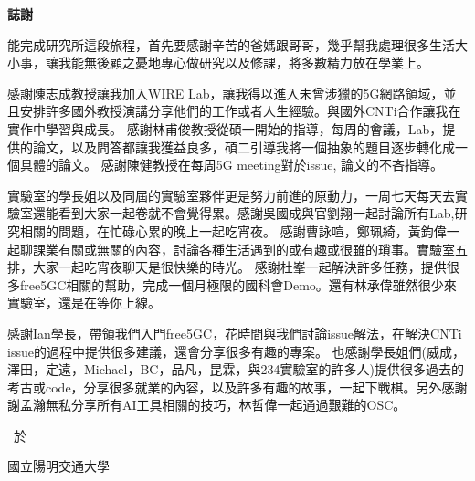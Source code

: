 \thispagestyle{empty}

\begin{center}
\Large
\textbf{誌\hspace{1cm}謝}
\end{center}

\vspace{1cm}
{
\linespread{2}%
\selectfont
\hspace{0.25cm}

能完成研究所這段旅程，首先要感謝辛苦的爸媽跟哥哥，幾乎幫我處理很多生活大小事，讓我能無後顧之憂地專心做研究以及修課，將多數精力放在學業上。

感謝陳志成教授讓我加入WIRE Lab，讓我得以進入未曾涉獵的5G網路領域，並且安排許多國外教授演講分享他們的工作或者人生經驗。與國外CNTi合作讓我在實作中學習與成長。
感謝林甫俊教授從碩一開始的指導，每周的會議，Lab，提供的論文，以及問答都讓我獲益良多，碩二引導我將一個抽象的題目逐步轉化成一個具體的論文。
感謝陳健教授在每周5G meeting對於issue, 論文的不吝指導。

實驗室的學長姐以及同屆的實驗室夥伴更是努力前進的原動力，一周七天每天去實驗室還能看到大家一起卷就不會覺得累。感謝吳國成與官劉翔一起討論所有Lab,研究相關的問題，在忙碌心累的晚上一起吃宵夜。
感謝曹詠喧，鄭珮綺，黃鈞偉一起聊課業有關或無關的內容，討論各種生活遇到的或有趣或很雖的瑣事。實驗室五排，大家一起吃宵夜聊天是很快樂的時光。
感謝杜峯一起解決許多任務，提供很多free5GC相關的幫助，完成一個月極限的國科會Demo。還有林承偉雖然很少來實驗室，還是在等你上線。

感謝Ian學長，帶領我們入門free5GC，花時間與我們討論issue解法，在解決CNTi issue的過程中提供很多建議，還會分享很多有趣的專案。
也感謝學長姐們(威成，澤田，定遠，Michael，BC，品凡，昆霖，與234實驗室的許多人)提供很多過去的考古或code，分享很多就業的內容，以及許多有趣的故事，一起下戰棋。另外感謝謝孟瀚無私分享所有AI工具相關的技巧，林哲偉一起通過艱難的OSC。

\vspace{3cm}
\begin{flushright}
\studentCnName \ 於

國立陽明交通大學\ \NameofDepartmentInstituteCN

\ThesisDateTW
\end{flushright}
}